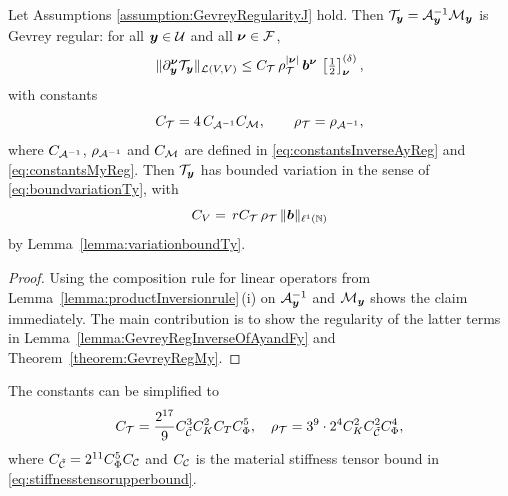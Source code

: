 \begin{lemma}\label{lemma:GevreyRegularityTy}
Let Assumptions \ref{assumption:GevreyRegularityJ} hold. Then $\mathcal{T}_{\boldsymbol{y}}=\mathcal{A}_{\boldsymbol{y}}^{-1}\mathcal{M}_{\boldsymbol{y}}$ is Gevrey regular:
for all ${\boldsymbol{y}}\in\mathcal{U}$ and all ${\boldsymbol{\nu}}\in\mathcal{F}$,
\begin{equation}\label{eq:GevreyTy}
   \|\partial^{{\boldsymbol{\nu}}}_{{\boldsymbol{y}}}\mathcal{T}_{\boldsymbol{y}}\|_{\mathcal{L}(V,V)}
   \le C_{\mathcal{T}}\,\rho_{\mathcal{T}}^{|{\boldsymbol{\nu}}|}\,{\boldsymbol{b}}^{{\boldsymbol{\nu}}}\,\left[\tfrac{1}{2} \right]^{(\delta)}_{{\boldsymbol{\nu}}} ,
\end{equation}
with constants
\begin{equation}\label{eq:constantRegTy}
    C_{\mathcal{T}}=4\,C_{\mathcal{A}^{-1}}C_{\mathcal{M}},\qquad \rho_{\mathcal{T}}=\rho_{\mathcal{A}^{-1}},
\end{equation}
where $C_{\mathcal{A}^{-1}}$, $\rho_{\mathcal{A}^{-1}}$ and $C_{\mathcal{M}}$ are defined in
\eqref{eq:constantsInverseAyReg} and \eqref{eq:constantsMyReg}.
 Then $\mathcal{T}_{\boldsymbol{y}}$ has bounded variation in the sense of
\eqref{eq:boundvariationTy}, with
\begin{equation*}
    C_V=\,r C_{\mathcal{T}}\,\rho_{\mathcal{T}}\,\|{\boldsymbol{b}}\|_{\ell^1(\mathbb{N})}
\end{equation*}
by Lemma~\ref{lemma:variationboundTy}.
\end{lemma}
\begin{proof}
Using the composition rule for linear operators from Lemma~\ref{lemma:productInversionrule}\,(i) on $\mathcal{A}^{-1}_{\boldsymbol{y}}$ and $\mathcal{M}_{{\boldsymbol{y}}}$ shows the claim immediately. The main contribution is to show the regularity of the latter terms in Lemma~\ref{lemma:GevreyRegInverseOfAyandFy} and Theorem~\ref{theorem:GevreyRegMy}.
\end{proof}
The constants can be simplified to
\begin{align*}
    C_{\mathcal{T}} = \frac{2^{17}}{9} C^3_{\tilde {\mathcal{C}}} C_K^2 C_T C_\Phi^5, \quad \rho_{\mathcal{T}} = 3^9 \cdot 2^4 C_K^2 C_{\tilde {\mathcal{C}}}^2 C_\Phi^4,
\end{align*}
where $C_{\tilde {\mathcal{C}}} = 2^{11} C_\Phi^5 C_{\mathcal{C}}$ and $C_{\mathcal{C}}$ is the material stiffness tensor bound in \eqref{eq:stiffnesstensorupperbound}. 



